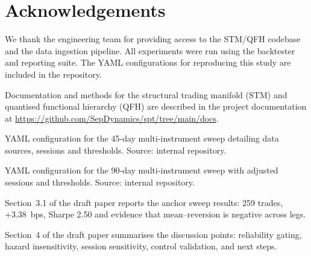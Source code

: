\documentclass[11pt]{article}
\begin{document}
\section*{Acknowledgements}
We thank the engineering team for providing access to the STM/QFH
codebase and the data ingestion pipeline.  All experiments were run
using the backtester and reporting suite.  The YAML configurations
for reproducing this study are included in the repository.

\begin{thebibliography}{9}
 Documentation and methods for the structural
  trading manifold (STM) and quantised functional hierarchy (QFH) are
  described in the project documentation at
  \url{https://github.com/SepDynamics/spt/tree/main/docs}.

 YAML configuration for the 45‐day
  multi‐instrument sweep detailing data sources, sessions and
  thresholds.  Source: internal repository.

 YAML configuration for the 90‐day
  multi‐instrument sweep with adjusted sessions and thresholds.
  Source: internal repository.

 Section~3.1 of the draft paper reports the
  anchor sweep results: 259 trades, +3.38 bps, Sharpe 2.50 and
  evidence that mean–reversion is negative across legs.

 Section~4 of the draft paper summarises the
  discussion points: reliability gating, hazard insensitivity,
  session sensitivity, control validation, and next steps.
\end{thebibliography}
\end{document}
